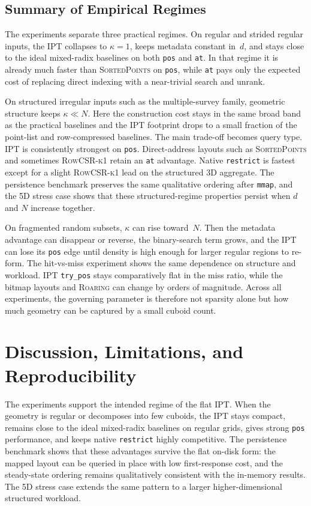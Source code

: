 \documentclass[manuscript,screen,review]{acmart}
\theoremstyle{definition}
\theoremstyle{plain}
\begin{document}
\subsection{Summary of Empirical Regimes}
\label{section:results-summary}

The experiments separate three practical regimes. On regular and
strided regular inputs, the IPT collapses to $\kappa = 1$, keeps
metadata constant in~$d$, and stays close to the ideal mixed-radix
baselines on both \texttt{pos} and \texttt{at}. In that regime it is
already much faster than \textsc{SortedPoints} on \texttt{pos}, while
\texttt{at} pays only the expected cost of replacing direct indexing
with a near-trivial search and unrank.

On structured irregular inputs such as the multiple-survey family,
geometric structure keeps $\kappa \ll N$. Here the construction cost
stays in the same broad band as the practical baselines and the IPT
footprint drops to a small fraction of the point-list and
row-compressed baselines. The main
trade-off becomes query type. IPT is consistently strongest on
\texttt{pos}. Direct-address layouts such as \textsc{SortedPoints} and
sometimes \textsc{RowCSR-k1} retain an \texttt{at} advantage. Native
\texttt{restrict} is fastest except for a slight
\textsc{RowCSR-k1} lead on the structured 3D aggregate. The
persistence benchmark preserves the same qualitative ordering after
\texttt{mmap}, and the 5D stress case shows that these structured-regime
properties persist when $d$ and $N$ increase together.

On fragmented random subsets, $\kappa$ can rise toward~$N$. Then the
metadata advantage can disappear or reverse, the binary-search term
grows, and the IPT can lose its \texttt{pos} edge until density is high
enough for larger regular regions to re-form. The hit-vs-miss
experiment shows the same dependence on structure and workload. IPT
\texttt{try\_pos} stays comparatively flat in the miss ratio, while the
bitmap layouts and \textsc{Roaring} can change by orders of magnitude.
Across all experiments, the governing parameter is therefore not
sparsity alone but how much geometry can be captured by a small cuboid
count.

\section{Discussion, Limitations, and Reproducibility}
\label{section:discussion}

The experiments support the intended regime of the flat IPT. When the
geometry is regular or decomposes into few cuboids, the IPT stays
compact, remains close to the ideal mixed-radix baselines on regular
grids, gives strong \texttt{pos} performance, and keeps native
\texttt{restrict} highly competitive. The persistence benchmark shows
that these advantages survive the flat on-disk form: the mapped layout
can be queried in place with low first-response cost, and the
steady-state ordering remains qualitatively consistent with the
in-memory results. The 5D stress case extends the same pattern to a
larger higher-dimensional structured workload.
\end{document}
